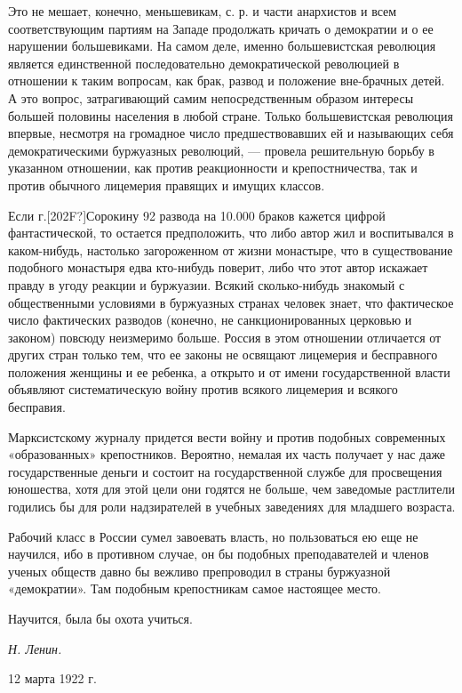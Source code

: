 Это не мешает, конечно, меньшевикам, с. р. и части анархистов и всем
соответствующим партиям на Западе продолжать кричать о демократии и о ее
нарушении большевиками. На самом деле, именно большевистская революция
является единственной последовательно демократической революцией в
отношении к таким вопросам, как брак, развод и положение вне-брачных детей.
А это вопрос, затрагивающий самим непосредственным образом интересы большей
половины населения в любой стране. Только большевистская революция впервые,
несмотря на громадное число предшествовавших ей и называющих себя
демократическими буржуазных революций, — провела решительную борьбу в
указанном отношении, как против реакционности и крепостничества, так и
против обычного лицемерия правящих и имущих классов.

Если г.\textlatin{[202F?]}Сорокину 92 развода на 10.000 браков кажется
цифрой фантастической, то остается предположить, что либо автор жил и
воспитывался в каком-нибудь, настолько загороженном от жизни монастыре, что
в существование подобного монастыря едва кто-нибудь поверит, либо что этот
автор искажает правду в угоду реакции и буржуазии. Всякий сколько-нибудь
знакомый с общественными условиями в буржуазных странах человек знает, что
фактическое число фактических разводов (конечно, не санкционированных
церковью и законом) повсюду неизмеримо больше. Россия в этом отношении
отличается от других стран только тем, что ее законы не освящают лицемерия
и бесправного положения женщины и ее ребенка, а открыто и от имени
государственной власти объявляют систематическую войну против всякого
лицемерия и всякого бесправия.

Марксистскому журналу придется вести войну и против подобных современных
«образованных» крепостников. Вероятно, немалая их часть получает у нас даже
государственные деньги и состоит на государственной службе для просвещения
юношества, хотя для этой цели они годятся не больше, чем заведомые
растлители годились бы для роли надзирателей в учебных заведениях для
младшего возраста.

Рабочий класс в России сумел завоевать власть, но пользоваться ею еще не
научился, ибо в противном случае, он бы подобных преподавателей и членов
ученых обществ давно бы вежливо препроводил в страны буржуазной
«демократии». Там подобным крепостникам самое настоящее место.

Научится, была бы охота учиться.

{\raggedleft
\textit{Н. Ленин.}
\par}

12 марта 1922 г.


\bigskip
